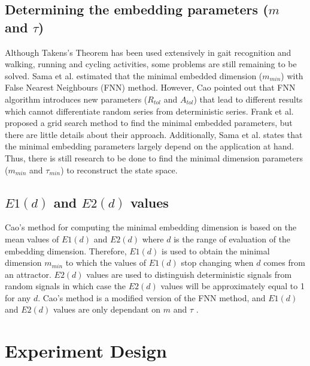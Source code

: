 \documentclass{sigchi}
\begin{document}
\subsection{Determining the embedding parameters ($m$ and $\tau$)}
Although Takens's Theorem has been used extensively in gait
recognition and walking, running and cycling activities,
some problems are still remaining to be solved.
Sama et al. \cite{Sama2013} estimated that the minimal embedded
dimension ($m_{min}$) with False Nearest Neighbours (FNN) method.
However, Cao \cite{Cao1997} pointed out that FNN algorithm
introduces new parameters ($R_{tol}$ and $A_{tol}$) that lead
to different results which cannot differentiate random series from
deterministic series.
Frank et al. \cite{Frank2010} proposed a grid search method to find the minimal
embedded parameters, but there are little details about their approach.
Additionally, Sama et al. \cite{Sama2013} states that the minimal embedding
parameters largely depend on the
application at hand. Thus, there is still research to be done to find the
minimal dimension parameters ($m_{min}$ and $\tau_{min}$)
to reconstruct the state space.

\subsection{$E1(d)$ and $E2(d)$ values}
Cao's method for computing the minimal embedding dimension is based on the
mean values of $E1(d)$ and $E2(d)$ where $d$ is the range of evaluation of the
embedding dimension. Therefore, $E1(d)$ is used to obtain the minimal
dimension $m_{min}$ to which the values of $E1(d)$ stop changing when
 $d$ comes from an attractor. $E2(d)$ values are used to distinguish
 deterministic signals from random signals in which case the $E2(d)$
 values will be approximately equal to 1 for any $d$.
Cao's method is a modified version of the FNN method, and $E1(d)$ and $E2(d)$
values are only dependant on $m$ and $\tau$ \cite{Cao1997}.






\section{Experiment Design}
\end{document}

